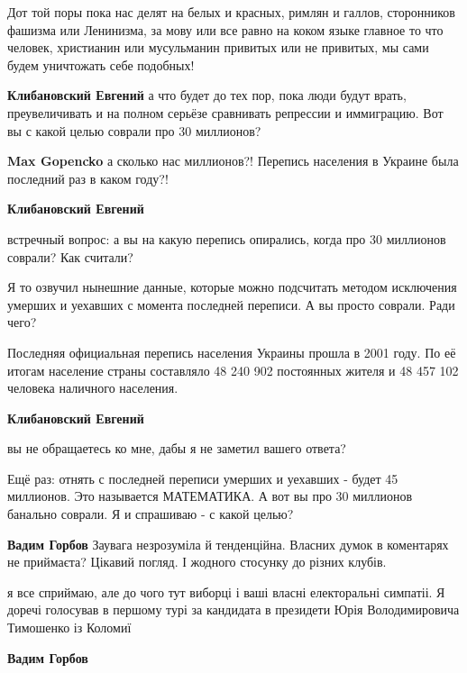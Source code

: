 \begin{itemize}
\begin{itemize}
Дот той поры пока нас делят на белых и красных, римлян и галлов, сторонников
фашизма или Ленинизма, за мову или все равно на коком языке главное то что
человек, христианин или мусульманин привитых или не привитых, мы сами будем
уничтожать себе подобных!

\begin{itemize} %
\textbf{Клибановский Евгений} а что будет до тех пор, пока люди будут врать, преувеличивать и на полном серьёзе сравнивать репрессии и иммиграцию. Вот вы с какой целью соврали про 30 миллионов?

\textbf{Max Gopencko} а сколько нас миллионов?! Перепись населения в Украине была последний раз в каком году?!

\textbf{Клибановский Евгений} 

встречный вопрос: а вы на какую перепись опирались, когда про 30 миллионов соврали? Как считали?

Я то озвучил нынешние данные, которые можно подсчитать методом исключения
умерших и уехавших с момента последней переписи. А вы просто соврали. Ради
чего?


Последняя официальная перепись населения Украины прошла в 2001 году. По её
итогам население страны составляло 48 240 902 постоянных жителя и 48 457 102
человека наличного населения.

\textbf{Клибановский Евгений} 

вы не обращаетесь ко мне, дабы я не заметил вашего ответа?

Ещё раз: отнять с последней переписи умерших и уехавших - будет 45 миллионов.
Это называется МАТЕМАТИКА. А вот вы про 30 миллионов банально соврали. Я и
спрашиваю - с какой целью?

\end{itemize} %

\textbf{Вадим Горбов}
Заувага незрозуміла й тенденційна. Власних думок в коментарях не приймаєта? Цікавий погляд. І жодного стосунку до різних клубів.


я все сприймаю, але до чого тут виборці і ваші власні електоральні симпатіі. Я
доречі голосував в першому турі за кандидата в президети Юрія Володимировича
Тимошенко із Коломиї

\begin{itemize} %
\textbf{Вадим Горбов}


\end{itemize}
\end{itemize}
\end{itemize}
